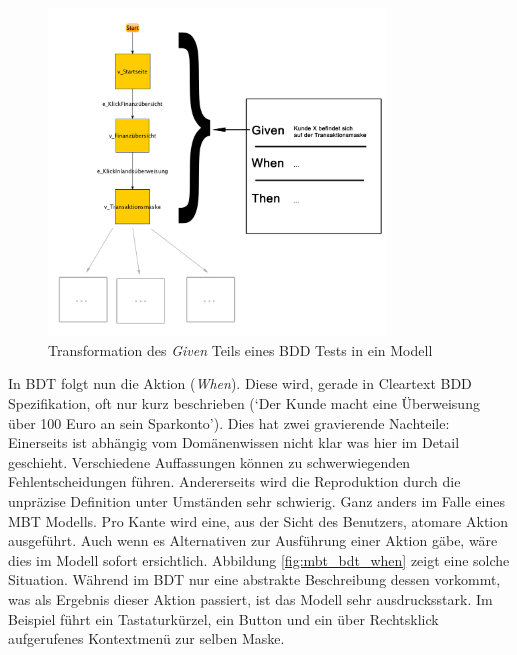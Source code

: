 \begin{figure} 
  \centering
     \includegraphics[width=0.8\textwidth]{figures/mbt_bdt_given.png}
  \caption{Transformation des \textit{Given} Teils eines BDD Tests in ein Modell}
  \label{fig:mbt_bdt_given}
\end{figure}

In \Gls{BDT} folgt nun die Aktion (\textit{When}). Diese wird, gerade in Cleartext \Gls{BDD} Spezifikation, oft nur kurz beschrieben (`Der Kunde macht eine Überweisung über 100 Euro an sein Sparkonto'). Dies hat zwei gravierende Nachteile: Einerseits ist abhängig vom Domänenwissen nicht klar was hier im Detail geschieht. Verschiedene Auffassungen können zu schwerwiegenden Fehlentscheidungen führen. Andererseits wird die Reproduktion durch die unpräzise Definition unter Umständen sehr schwierig. Ganz anders im Falle eines \Gls{MBT} Modells. Pro Kante wird eine, aus der Sicht des Benutzers, atomare Aktion ausgeführt. Auch wenn es Alternativen zur Ausführung einer Aktion gäbe, wäre dies im Modell sofort ersichtlich. Abbildung \ref{fig:mbt_bdt_when} zeigt eine solche Situation. Während im \Gls{BDT} nur eine abstrakte Beschreibung dessen vorkommt, was als Ergebnis dieser Aktion passiert, ist das Modell sehr ausdrucksstark. Im Beispiel führt ein Tastaturkürzel, ein Button und ein über Rechtsklick aufgerufenes Kontextmenü zur selben Maske.

